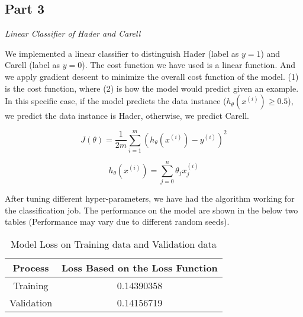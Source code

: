 \documentclass{article}
\begin{document}
\newpage
\begin{part3}

\maketitle

\newpage
\section{Part 3}
\noindent \textit{Linear Classifier of Hader and Carell}

\vspace{5mm}

We implemented a linear classifier to distinguish Hader (label as $y = 1$) and Carell (label as $y = 0$). The cost function we have used is a linear function. And we apply gradient descent to minimize the overall cost function of the model. (1) is the cost function, where (2) is how the model would predict given an example. In this specific case, if the model predicts the data instance ($h_{\theta}(x^{(i)}) \geq 0.5$), we predict the data instance is Hader, otherwise, we predict Carell.

\begin{equation}
J(\theta) = \frac{1}{2m} \sum_{i = 1}^{m} (h_{\theta}(x^{(i)}) - y^{(i)})^2
\end{equation}

\begin{equation}
h_{\theta}(x^{(i)}) = \sum_{j = 0}^{n} \theta_{j}  x_{j}^{(i)}
\end{equation}

\vspace{5mm}

After tuning different hyper-parameters, we have had the algorithm working for the classification job. The performance on the model are shown in the below two tables (Performance may vary due to different random seeds). 

\begin{table}[h!]
\centering
\begin{tabular}{||c c||} 
 \hline
 Process & Loss Based on the Loss Function \\ [0.5ex] 
 \hline\hline
 Training & 0.14390358  \\ 
 Validation & 0.14156719  \\ [1ex] 
 \hline
\end{tabular}
\caption{Model Loss on Training data and Validation data}
\label{table:1}
\end{table}


\end{part3}
\end{document}

